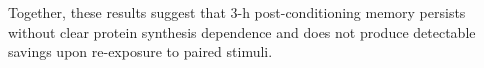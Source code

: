 Together, these results suggest that 3-h post-conditioning memory persists without clear protein synthesis dependence and does not produce detectable savings upon re-exposure to paired stimuli.







